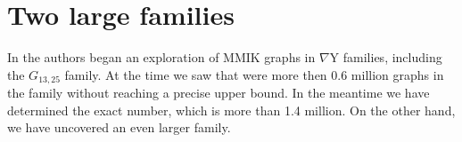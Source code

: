 \documentclass{amsart}
\newtheorem{question}[theorem]{Question}
\theoremstyle{remark}
\newcommand{\ty}{\nabla\mathrm{Y}}
\begin{document}
{%






\section{Two large families}

In \cite{GMN} the authors began an exploration of MMIK graphs in 
$\ty$ families, including the $G_{13,25}$ family. At the time
we saw that were more then 0.6 million graphs in the family 
without reaching a precise upper bound. In the meantime we have 
determined the exact number, which is more than 1.4 million. 
On the other hand, we have uncovered an even larger family.

}
\end{document}

